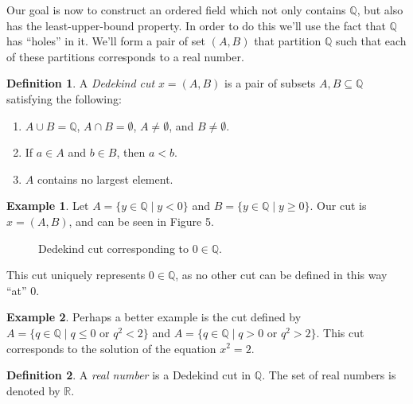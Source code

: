 \documentclass{article}
\newcommand{\R}{\mathbb{R}}
\newcommand{\Q}{\mathbb{Q}}
\theoremstyle{definition}
\newtheorem{definition}{Definition}[section]
\newtheorem{example}{Example}[section]
\begin{document}
	Our goal is now to construct an ordered field which not only contains $ \Q $, but also has the least-upper-bound property. In order to do this we'll use the fact that $ \Q $ has ``holes'' in it. We'll form a pair of set $ (A,B) $ that partition $ \Q $ such that each of these partitions corresponds to a real number. 
	
	\begin{definition}\label{def1.13}
		A \textit{\color{red}Dedekind cut} $ x=(A,B) $ is a pair of subsets $ A,B\subseteq \Q $ satisfying the following:
		\begin{enumerate}
			\item $ A\cup B=\Q $, $ A\cap B=\emptyset $, $ A\neq\emptyset $, and $ B\neq\emptyset $.
			\item If $ a\in A $ and $ b\in B $, then $ a<b $.
			\item $ A $ contains no largest element.
		\end{enumerate}
	\end{definition} 
	\begin{example}
		Let $ A=\{y\in \Q \mid y<0\} $ and $ B=\{y\in\Q\mid y\ge 0\} $. Our cut is $ x=(A,B) $, and can be seen in Figure 5.
		\begin{figure}[h]
			\centering
			\caption{Dedekind cut corresponding to $ 0\in\Q $.}
		\end{figure}
		This cut uniquely represents $ 0\in\Q $, as no other cut can be defined in this way ``at'' $ 0 $. 
	\end{example}
	\begin{example}
		Perhaps a better example is the cut defined by $ A=\{q\in\Q\mid q\le 0\text{ or }q^2<2 \} $ and $ A=\{q\in\Q\mid q> 0\text{ or }q^2>2 \} $. This cut corresponds to the solution of the equation $ x^2=2 $.  
	\end{example}
	\begin{definition}\label{def1.14}
		A \textit{\color{red}real number} is a Dedekind cut in $ \Q $. The set of real numbers is denoted by $ \R $. 
	\end{definition}
\end{document}
